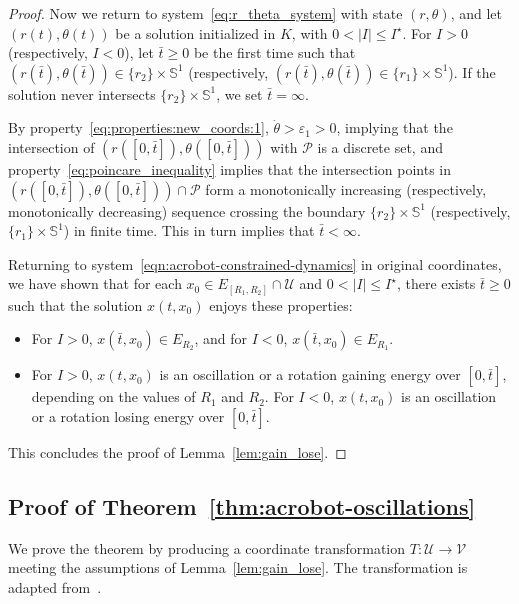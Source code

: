 \documentclass[journal,twoside,web, twocolumn]{ieeecolor}
\newcommand*{\Sone}{\mathbb{S}^1}
\newcommand*{\cU}{\mathcal{U}}
\newcommand*{\cV}{\mathcal{V}}
\newcommand*{\cP}{\mathcal{P}}
\begin{document}
\begin{proof}
Now we return to system~\eqref{eq:r_theta_system} with state $(r,\theta)$, and let $(r(t),\theta(t))$ be a solution initialized in $K$, with $0< |I| \leq I^\star$. 
For $I>0$ (respectively, $I<0$), let $\bar t \geq 0$ be the first time such that $( r(\bar t), \theta(\bar t)) \in \{r_2\} \times \Sone$ (respectively, $( r(\bar t), \theta(\bar t)) \in \{r_1\} \times \Sone$). If the solution never intersects $\{r_2\} \times \Sone$, we set $\bar t = \infty$.

By property~\eqref{eq:properties:new_coords:1}, $\dot \theta > \varepsilon_1>0$, implying that the intersection of $( r([0,\bar t]),\theta([0,\bar t]) )$ with $\cP$ is a discrete set, and property~\eqref{eq:poincare_inequality} implies that the intersection points in $( r([0,\bar t]),\theta([0,\bar t]) ) \cap \cP$ form a monotonically increasing (respectively, monotonically decreasing) sequence crossing the boundary $\{r_2\} \times \Sone$ (respectively, $\{r_1\} \times \Sone$) in finite time. This in turn implies that $\bar t< \infty$. 

Returning to system~\eqref{eqn:acrobot-constrained-dynamics} in original coordinates, we have shown that for each $x_0 \in E_{[R_1,R_2]}\cap \cU$ and $0< |I| \leq I^\star$, there exists $\bar t\geq 0$ such that the solution $x(t,x_0)$ enjoys these properties:
\begin{itemize}
\item For $I>0$, $x(\bar t,x_0) \in E_{R_2}$, and for $I<0$, $x(\bar t,x_0) \in E_{R_1}$.
\item For $I>0$, $x(t,x_0)$ is an oscillation or a rotation gaining energy over $[0, \bar t]$, depending on the values of $R_1$ and $R_2$. For $I<0$, $x(t,x_0)$ is an oscillation or a rotation losing energy over $[0, \bar t]$.
\end{itemize}
This concludes the proof of Lemma~\ref{lem:gain_lose}.
\end{proof}



\subsection{Proof of Theorem~\ref{thm:acrobot-oscillations}}

We prove the theorem by producing a coordinate transformation $T : \cU \to \cV$ meeting the assumptions of Lemma~\ref{lem:gain_lose}. The transformation is adapted from~\cite{dynamic_vhcs_stabilize_closed_orbits}.
  
\end{document}
